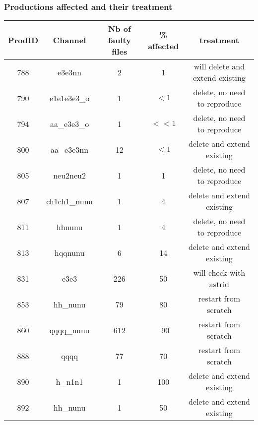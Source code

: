 \documentclass{beamer}
\begin{document}
\begin{frame}
\frametitle{Productions affected and their treatment}
\begin{center}
{\scriptsize 
\begin{tabular}{ccccc}
    \toprule
ProdID & Channel & Nb of faulty files & \% affected & treatment \\
\midrule
788 & e3e3nn & 2 & 1 & will delete and extend existing\\
790 & e1e1e3e3\_o & 1  & $<1$ & delete, no need to reproduce\\
794 & aa\_e3e3\_o  & 1 &$<<1$& delete, no need to reproduce\\
800& aa\_e3e3nn & 12 & $<1$ & delete and extend existing\\
805& neu2neu2 & 1 & 1 & delete, no need to reproduce\\
807& ch1ch1\_nunu & 1 & 4 & delete and extend existing\\
811& hhnunu & 1 & 4 & delete, no need to reproduce\\
813& hqqnunu & 6 & 14 & delete and extend existing \\
831& e3e3 & 226 & 50 & will check with astrid \\
853& hh\_nunu & 79 & 80 & restart from scratch\\
860& qqqq\_nunu & 612 &~90& restart from scratch\\
888& qqqq & 77 & 70 & restart from scratch\\
890& h\_n1n1 & 1 & 100 & delete and extend existing\\
892& hh\_nunu & 1 & 50 & delete and extend existing\\
    \bottomrule
\end{tabular}
}
\end{center}
\end{frame}
\end{document}
